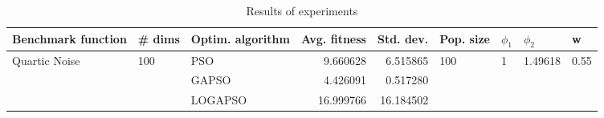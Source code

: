 \begin{table}
\centering
\caption{Results of experiments}
\begin{tabular}{lllrrllll}
\toprule
            Benchmark function &              \# dims & Optim. algorithm &  Avg. fitness &  Std. dev. &            Pop. size &         $\phi_{1}$ &               $\phi_{2}$ &                     w \\
\midrule
\multirow{3}{*}{Quartic Noise} & \multirow{3}{*}{100} &              PSO &      9.660628 &   6.515865 & \multirow{3}{*}{100} & \multirow{3}{*}{1} & \multirow{3}{*}{1.49618} & \multirow{3}{*}{0.55} \\
                               &                      &            GAPSO &      4.426091 &   0.517280 &                      &                    &                          &                       \\
                               &                      &          LOGAPSO &     16.999766 &  16.184502 &                      &                    &                          &                       \\
\bottomrule
\end{tabular}
\end{table}
